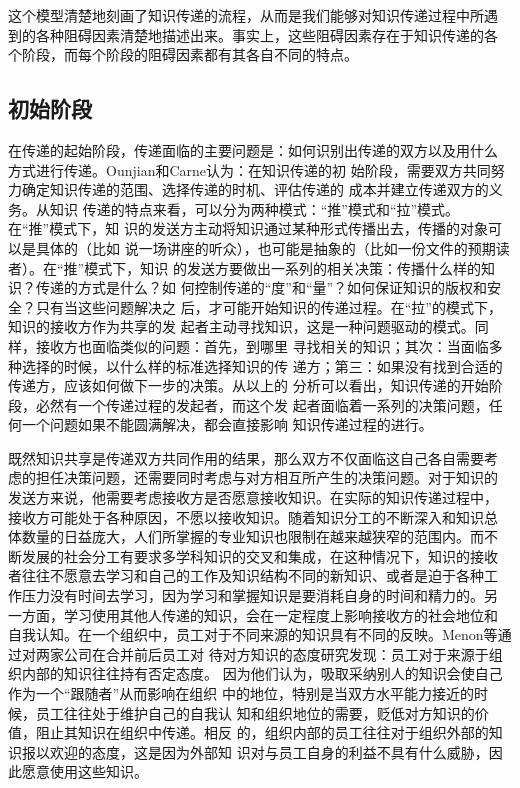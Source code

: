 \documentclass[12pt,a4paper]{ctexart}
\begin{document}
这个模型清楚地刻画了知识传递的流程，从而是我们能够对知识传递过程中所遇
到的各种阻碍因素清楚地描述出来。事实上，这些阻碍因素存在于知识传递的各
个阶段，而每个阶段的阻碍因素都有其各自不同的特点。

\subsection{初始阶段}


在传递的起始阶段，传递面临的主要问题是：如何识别出传递的双方以及用什么
方式进行传递。Ounjian和Carne\cite{ounjian1987sfa}认为：在知识传递的初
始阶段，需要双方共同努力确定知识传递的范围、选择传递的时机、评估传递的
成本并建立传递双方的义务。从知识
传递的特点来看，可以分为两种模式：“推”模式和“拉”模式。在“推”模式下，知
识的发送方主动将知识通过某种形式传播出去，传播的对象可以是具体的（比如
说一场讲座的听众），也可能是抽象的（比如一份文件的预期读者）。在“推”模式下，知识
的发送方要做出一系列的相关决策：传播什么样的知识？传递的方式是什么？如
何控制传递的“度”和“量”？如何保证知识的版权和安全？只有当这些问题解决之
后，才可能开始知识的传递过程。在“拉”的模式下，知识的接收方作为共享的发
起者主动寻找知识，这是一种问题驱动的模式。同样，接收方也面临类似的问题：首先，到哪里
寻找相关的知识；其次：当面临多种选择的时候，以什么样的标准选择知识的传
递方；第三：如果没有找到合适的传递方，应该如何做下一步的决策。从以上的
分析可以看出，知识传递的开始阶段，必然有一个传递过程的发起者，而这个发
起者面临着一系列的决策问题，任何一个问题如果不能圆满解决，都会直接影响
知识传递过程的进行。

既然知识共享是传递双方共同作用的结果，那么双方不仅面临这自己各自需要考
虑的担任决策问题，还需要同时考虑与对方相互所产生的决策问题。对于知识的
发送方来说，他需要考虑接收方是否愿意接收知识。在实际的知识传递过程中，
接收方可能处于各种原因，不愿以接收知识。随着知识分工的不断深入和知识总
体数量的日益庞大，人们所掌握的专业知识也限制在越来越狭窄的范围内。而不
断发展的社会分工有要求多学科知识的交叉和集成，在这种情况下，知识的接收
者往往不愿意去学习和自己的工作及知识结构不同的新知识、或者是迫于各种工
作压力没有时间去学习，因为学习和掌握知识是要消耗自身的时间和精力的。另
一方面，学习使用其他人传递的知识，会在一定程度上影响接收方的社会地位和
自我认知。在一个组织中，员工对于不同来源的知识具有不同的反映。Menon等\cite{2203456620060801}通过对两家公司在合并前后员工对
待对方知识的态度研究发现：员工对于来源于组织内部的知识往往持有否定态度。
因为他们认为，吸取采纳别人的知识会使自己作为一个“跟随者”从而影响在组织
中的地位，特别是当双方水平能力接近的时候，员工往往处于维护自己的自我认
知和组织地位的需要，贬低对方知识的价值，阻止其知识在组织中传递。相反
的，组织内部的员工往往对于组织外部的知识报以欢迎的态度，这是因为外部知
识对与员工自身的利益不具有什么威胁，因此愿意使用这些知识。
\end{document}
